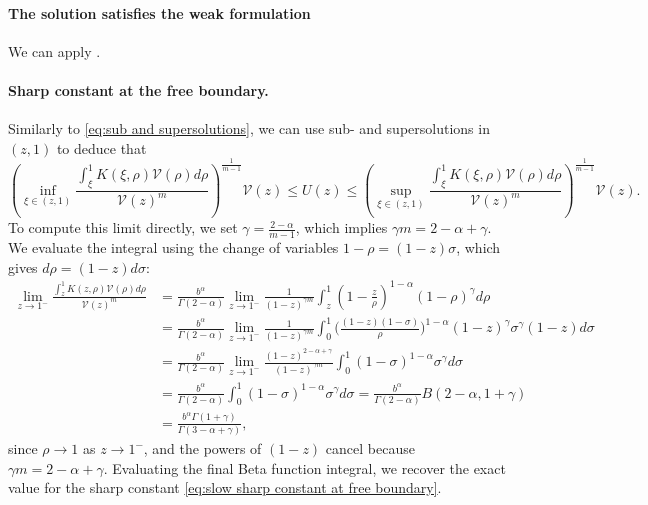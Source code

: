 \documentclass[a4paper]{article}
\theoremstyle{definition}
\begin{document}
\paragraph{The solution satisfies the weak formulation}
We can apply .

\paragraph{Sharp constant at the free boundary.}
\label{sec:sharp constant at free boundary}
Similarly to \eqref{eq:sub and supersolutions}, we can use sub- and supersolutions in $(z,1)$ to deduce that
\begin{equation}
\label{eq:slow sub and supersolutions near free boundary}
\left(\inf_{\xi \in (z,1)} \frac{\int_\xi^1 K(\xi, \rho) \mathcal V(\rho) d\rho}{\mathcal V(z)^m}\right)^{\frac 1 {m-1}} \mathcal V(z) \le U(z) \le \left(\sup_{\xi \in (z,1)} \frac{\int_\xi^1 K(\xi, \rho) \mathcal V(\rho) d\rho}{\mathcal V(z)^m}\right)^{\frac 1 {m-1}}  \mathcal V(z).
\end{equation}
To compute this limit directly, we set $\gamma = \frac{2-\alpha}{m-1}$, which implies $\gamma m = 2 - \alpha + \gamma$. We evaluate the integral using the change of variables $1-\rho = (1-z)\sigma$, which gives $d\rho = (1-z)d\sigma$:
\begin{equation}
\label{eq:slow sharp constant at free boundary deduction}
\begin{aligned}
  \lim_{z \to 1^-} \frac{\int_z^1 K(z, \rho) \mathcal V(\rho) d\rho} {\mathcal V(z)^m}
  &= \frac{b^\alpha}{\Gamma(2-\alpha)} \lim_{z \to 1^-} \frac{1}{(1-z)^{\gamma m}} \int_{z}^1 (1-\tfrac{z}{\rho})^{1-\alpha} (1-\rho)^\gamma d \rho
  \\
  &= \frac{b^\alpha}{\Gamma(2-\alpha)} \lim_{z \to 1^-} \frac{1}{(1-z)^{\gamma m}} \int_{0}^1 \Big(\frac{(1-z)(1-\sigma)}{\rho}\Big)^{1-\alpha} (1-z)^\gamma \sigma^\gamma (1-z) d \sigma
  \\
  &= \frac{b^\alpha}{\Gamma(2-\alpha)} \lim_{z \to 1^-} \frac{(1-z)^{2-\alpha+\gamma}}{(1-z)^{\gamma m}} \int_{0}^1 (1-\sigma)^{1-\alpha} \sigma^\gamma d \sigma
  \\
  &=\frac{b^\alpha}{\Gamma(2-\alpha)} \int_{0}^1 (1-\sigma)^{1-\alpha} \sigma^\gamma d \sigma = \frac{b^\alpha}{\Gamma(2-\alpha)} B(2-\alpha, 1 + \gamma) \\
  &= \frac{b^\alpha \Gamma(1 + \gamma)}{\Gamma(3-\alpha+\gamma)},
\end{aligned}
\end{equation}
since $\rho \to 1$ as $z \to 1^-$, and the powers of $(1-z)$ cancel because $\gamma m = 2-\alpha+\gamma$. Evaluating the final Beta function integral, we recover the exact value for the sharp constant \eqref{eq:slow sharp constant at free boundary}.
\end{document}
